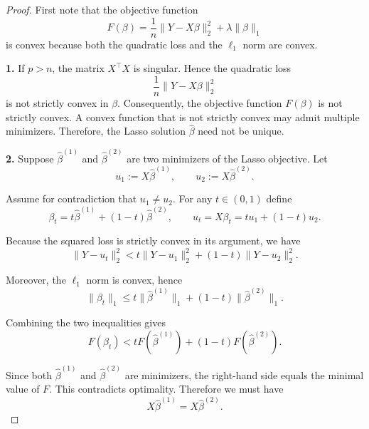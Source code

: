 \documentclass[12pt]{article}
\renewcommand{\(}{\left(}%
\renewcommand{\)}{\right)}%
\renewcommand{\[}{\left[}%
\renewcommand{\]}{\right]}%
\newtheorem{proof}{Proof.}}
\begin{document}
\begin{proof}
First note that the objective function
\begin{equation*}
F(\beta)
=
\frac{1}{n}\|Y-X\beta\|_2^2+\lambda\|\beta\|_1
\end{equation*}
is convex because both the quadratic loss and the $\ell_1$ norm are convex.

\medskip
\noindent
\textbf{1.}
If $p>n$, the matrix $X^\top X$ is singular. Hence the quadratic loss
\begin{equation*}
\frac{1}{n}\|Y-X\beta\|_2^2
\end{equation*}
is not strictly convex in $\beta$. Consequently, the objective function $F(\beta)$ is not strictly convex. A convex function that is not strictly convex may admit multiple minimizers. Therefore, the Lasso solution $\hat\beta$ need not be unique.

\medskip
\noindent
\textbf{2.}
Suppose $\hat\beta^{(1)}$ and $\hat\beta^{(2)}$ are two minimizers of the Lasso objective. Let
\begin{equation*}
u_1 := X\hat\beta^{(1)}, 
\qquad
u_2 := X\hat\beta^{(2)}.
\end{equation*}

Assume for contradiction that $u_1\neq u_2$. For any $t\in(0,1)$ define
\begin{equation*}
\beta_t
=
t\hat\beta^{(1)}+(1-t)\hat\beta^{(2)},
\qquad
u_t = X\beta_t
=
t u_1+(1-t)u_2.
\end{equation*}

Because the squared loss is strictly convex in its argument, we have
\begin{equation*}
\|Y-u_t\|_2^2
<
t\|Y-u_1\|_2^2+(1-t)\|Y-u_2\|_2^2.
\end{equation*}

Moreover, the $\ell_1$ norm is convex, hence
\begin{equation*}
\|\beta_t\|_1
\le
t\|\hat\beta^{(1)}\|_1+(1-t)\|\hat\beta^{(2)}\|_1.
\end{equation*}

Combining the two inequalities gives
\begin{equation*}
F(\beta_t)
<
tF(\hat\beta^{(1)})+(1-t)F(\hat\beta^{(2)}).
\end{equation*}

Since both $\hat\beta^{(1)}$ and $\hat\beta^{(2)}$ are minimizers, the right-hand side equals the minimal value of $F$. This contradicts optimality. Therefore we must have
\begin{equation*}
X\hat\beta^{(1)} = X\hat\beta^{(2)}.
\end{equation*}


\end{proof}
\end{document}
